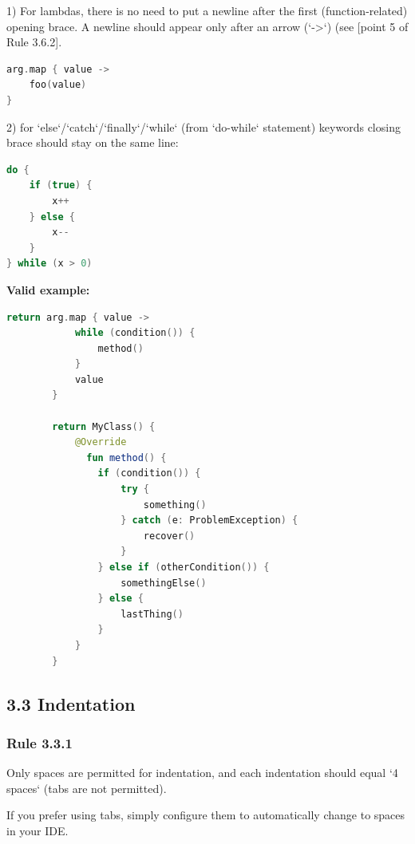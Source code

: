 1) For lambdas, there is no need to put a newline after the first (function-related) opening brace. A newline should appear only after an arrow (`->`) (see [point 5 of Rule 3.6.2].



\begin{lstlisting}[language=Kotlin]
arg.map { value ->
    foo(value)
}
\end{lstlisting}


2) for `else`/`catch`/`finally`/`while` (from `do-while` statement) keywords closing brace should stay on the same line:

\begin{lstlisting}[language=Kotlin]
do {
    if (true) {
        x++
    } else {
        x--
    }
} while (x > 0)
\end{lstlisting}


\textbf{Valid example:}



\begin{lstlisting}[language=Kotlin]
        return arg.map { value ->
            while (condition()) {
                method()
            }
            value
        }

        return MyClass() {
            @Override
              fun method() {
                if (condition()) {
                    try {
                        something()
                    } catch (e: ProblemException) {
                        recover()
                    }
                } else if (otherCondition()) {
                    somethingElse()
                } else {
                    lastThing()
                }
            }
        }
\end{lstlisting}


\subsection*{\textbf{3.3 Indentation}}

\subsubsection*{\textbf{Rule 3.3.1}}
\leavevmode\newline



Only spaces are permitted for indentation, and each indentation should equal `4 spaces` (tabs are not permitted).

If you prefer using tabs, simply configure them to automatically change to spaces in your IDE.

